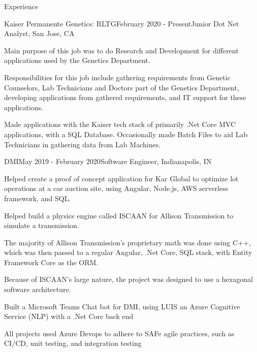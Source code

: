 \documentclass{resume} %
\begin{document}
\begin{rSection}{Experience}
\begin{rSubsection}{Kaiser Permanente Genetics: RLTG}{February 2020 - Present}{Junior Dot Net Analyst, San Jose, CA}

\item Main purpose of this job was to do Research and Development for different applications used by the Genetics Department.
\item Responsibilities for this job include gathering requirements from Genetic Counselors, Lab Technicians and Doctors part of the Genetics Department, developing applications from gathered requirements, and IT support for these applications.
\item Made applications with the Kaiser tech stack of primarily .Net Core MVC applications, with a SQL Database. Occasionally made Batch Files to aid Lab Technicians in gathering data from Lab Machines.
\end{rSubsection}
\begin{rSubsection}{DMI}{May 2019 - February 2020}{Software Engineer, Indianapolis, IN}

\item Helped create a proof of concept application for Kar Global to optimize lot operations at a car auction site, using Angular, Node.js, AWS serverless framework, and SQL.
\item Helped build a physics engine called ISCAAN for Allison Transmission to simulate a transmission.
\item The majority of Allison Transmission's proprietary math was done using C++, which was then passed to a regular Angular, .Net Core, SQL stack, with Entity Framework Core as the ORM. 
\item Because of ISCAAN's large nature, the project was designed to use a hexagonal software architecture. 
\item Built a Microsoft Teams Chat bot for DMI, using LUIS an Azure Cognitive Service (NLP) with a .Net Core back end
\item All projects used Azure Devops to adhere to SAFe agile practices, such as CI/CD, unit testing, and integration testing
\end{rSubsection}



\end{rSection}
\end{document}
